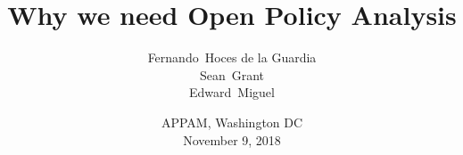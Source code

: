 \documentclass{beamer}
\begin{document}
\title[] %
{Why we need Open Policy Analysis}

\subtitle
{}


\author[] %
{Fernando~Hoces de la Guardia\\
Sean~Grant\\
Edward~Miguel\\}




\date[] %
{APPAM, Washington DC\\
November 9, 2018}



\begin{frame}
  \titlepage
\end{frame}


\end{document}
